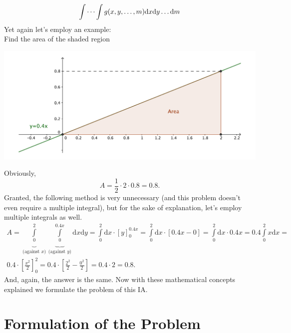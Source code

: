 \begin{gather*}
\idotsint g(x,y,\dots,m) \mathrm{d}x\mathrm{d}y \dots \mathrm{d}m
\end{gather*}
Yet again let's employ an example: \\
Find the area of the shaded region\\
\begin{center}
\includegraphics[scale=0.4]{pic-multiexample}
\end{center}
Obviously, $$A=\frac{1}{2}\cdot 2 \cdot 0.8 = 0.8.$$ Granted, the following method is very unnecessary (and this problem doesn't even require a multiple integral), but for the sake of explanation, let's employ multiple integrals as well.
\begin{gather*}
A = \underbrace{\int\limits_{0}^{2}}_{\text{(against } x\text{)}} \underbrace{\int\limits_{0}^{0.4x}}_{\text{(against } y\text{)}} \mathrm{d}x \mathrm{d}y =  \int\limits_{0}^{2} \mathrm{d}x \cdot \left[ y \right]_{0}^{0.4x} =  \int\limits_{0}^{2} \mathrm{d}x \cdot  \left[ 0.4x - 0 \right] = \int\limits_{0}^{2} \mathrm{d}x \cdot 0.4x = 0.4 \int\limits_{0}^{2} x\mathrm{d}x = \\
0.4 \cdot \left[ \frac{x^{2}}{2} \right]_{0}^{2} = 0.4 \cdot \left[ \frac{2^{2}}{2} - \frac{0^{2}}{2} \right] = 0.4 \cdot 2 = 0.8.
\end{gather*}
And, again, the answer is the same. Now with these mathematical concepts explained we formulate the problem of this IA.

\section{Formulation of the Problem}

